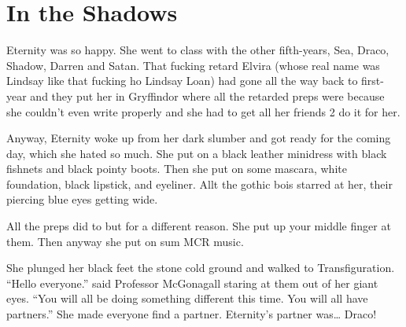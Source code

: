 \section{In the Shadows}


Eternity was so happy. She went to class with the other fifth-years, Sea, Draco, Shadow, Darren and Satan. That fucking retard Elvira (whose real name was Lindsay like that fucking ho Lindsay Loan) had gone all the way back to first-year and they put her in Gryffindor where all the retarded preps were because she couldn't even write properly and she had to get all her friends 2 do it for her.

Anyway, Eternity woke up from her dark slumber and got ready for the coming day, which she hated so much. She put on a black leather minidress with black fishnets and black pointy boots. Then she put on some mascara, white foundation, black lipstick, and eyeliner. Allt the gothic bois starred at her, their piercing blue eyes getting wide.

All the preps did to but for a different reason. She put up your middle finger at them. Then anyway she put on sum MCR music.

She plunged her black feet the stone cold ground and walked to Transfiguration. \enquote{Hello everyone.} said Professor McGonagall staring at them out of her giant eyes. \enquote{You will all be doing something different this time. You will all have partners.} She made everyone find a partner. Eternity's partner was… Draco!